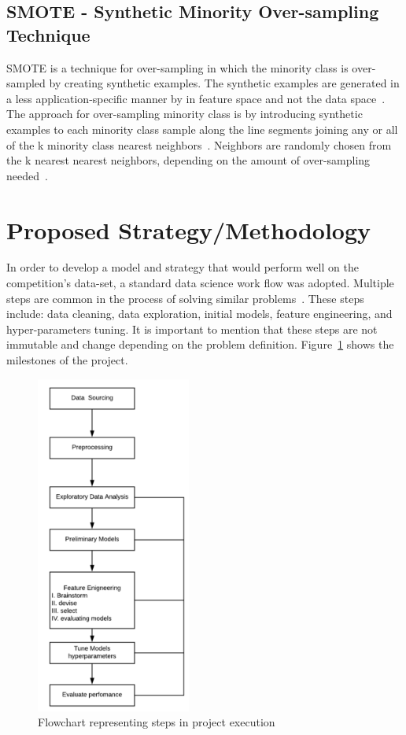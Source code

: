 \documentclass[journal,twoside,web]{ieeecolor}
\begin{document}
\subsection{SMOTE - Synthetic Minority Over-sampling Technique}
SMOTE is a technique for over-sampling in which the minority class is over-sampled by creating synthetic examples. The synthetic examples are generated in a less application-specific manner by in feature space and not the data space~\cite{chawla2002smote}. The approach for over-sampling minority class is by introducing synthetic examples to each minority class sample along the line segments joining any or all of the k minority class nearest neighbors~\cite{chawla2002smote}. Neighbors are randomly chosen from the k nearest nearest neighbors, depending on the amount of over-sampling needed~\cite{chawla2002smote}. 


\section{Proposed Strategy/Methodology}
In order to develop a model and strategy that would perform well on the competition's data-set, a standard data science work flow was adopted. Multiple steps are common in the process of solving similar problems~\cite{tandel_2017}. These steps include: data cleaning, data exploration, initial models, feature engineering, and hyper-parameters tuning. It is important to mention that these steps are not immutable and change depending on the problem definition. Figure~\ref{fig:flowchart} shows the milestones of the project.



\begin{figure}[h!]
  \centering
  \includegraphics[width=2in]{flowchart.png}
  \caption{Flowchart representing steps in project execution}
  \label{fig:flowchart}
\end{figure}
\end{document}
